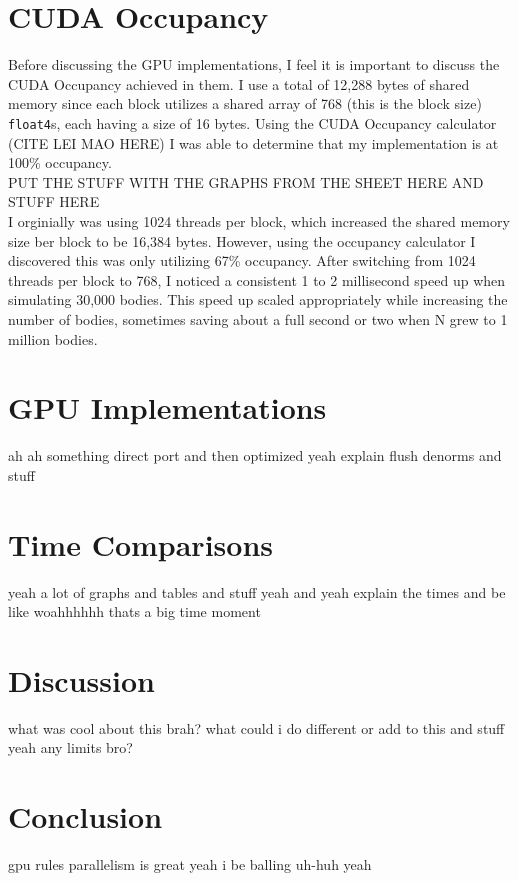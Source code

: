 \section{CUDA Occupancy}
Before discussing the GPU implementations, I feel it is important to discuss the CUDA Occupancy achieved in them. 
I use a total of 12,288 bytes of shared memory since each block utilizes a shared array of 
768 (this is the block size) \verb|float4|s, each having a size of 16 bytes. Using the CUDA Occupancy calculator (CITE LEI MAO HERE)
I was able to determine that my implementation is at 100\% occupancy. \\
PUT THE STUFF WITH THE GRAPHS FROM THE SHEET HERE AND STUFF HERE \\
I orginially was using 1024 threads per block, which increased the shared memory size ber block to be 16,384 bytes. However, 
using the occupancy calculator I discovered this was only utilizing 67\% occupancy. After switching from 1024 threads per block
to 768, I noticed a consistent 1 to 2 millisecond speed up when simulating 30,000 bodies. This speed up scaled appropriately while increasing 
the number of bodies, sometimes saving about a full second or two when N grew to 1 million bodies.

\section{GPU Implementations}
ah ah something direct port and then optimized yeah
explain flush denorms and stuff 

\section{Time Comparisons}
\label{sec:timing}
yeah a lot of graphs and tables and stuff yeah and yeah
explain the times and be like woahhhhhh thats a big time moment

\section{Discussion}
what was cool about this brah?
what could i do different or add to this and stuff yeah
any limits bro?

\section{Conclusion}
gpu rules parallelism is great yeah i be balling uh-huh yeah
